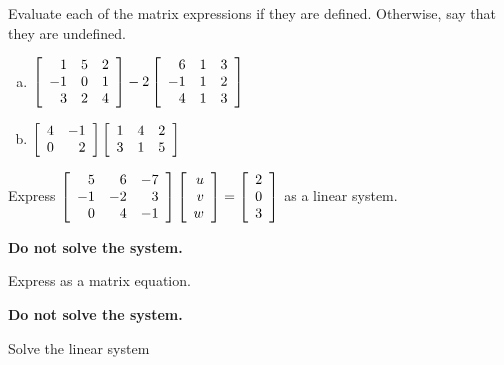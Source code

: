 \documentclass[11pt, legalpaper]{exam}
\begin{document}
\addpoints

\noindent
\begin{center}
\gradetable[v][pages]  %
\end{center}


\newpage %

%
%
%

\begin{questions}
\question[4] Evaluate each of the matrix expressions if they are defined.  Otherwise, say that they are undefined.
\begin{enumerate}[(a)]
\item $\MATRIX{rrr}{1 & 5 & 2\\-1 & 0 & 1\\3 & 2 & 4} - 2\MATRIX{rrr}{6 & 1 & 3\\-1 & 1 & 2\\4 & 1 & 3}$
\vfill

\item $\MATRIX{rr}{4 & -1\\0 & 2}\MATRIX{rrr}{1 & 4 & 2\\3 & 1 & 5}$
\vfill
\end{enumerate}

\question[2] Express $\MATRIX{rrr}{5 & 6 & -7\\-1 & -2 & 3\\0 & 4 & -1}\COLUMN{u\\v\\w} = \COLUMN{2\\0\\3}$ as a linear system.

\textbf{Do not solve the system.}
\vfill

\question[2] Express  as a matrix equation.

\textbf{Do not solve the system.}
\vfill

\newpage

\question[4] Solve the linear system 
\vfill
\vspace{6cm}


\end{questions}
\end{document}
